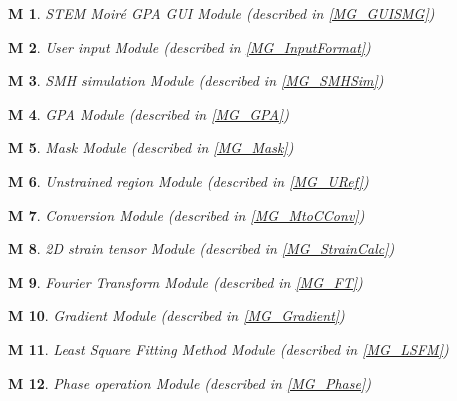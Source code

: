 \documentclass[12pt, titlepage]{article}
\newcommand{\progname}{STEM Moir{\'e} GPA}
\newtheorem{M}{M}
\begin{document}
\begin{M}\normalfont \progname{} GUI Module (described in \cref{MG_GUISMG})
\label{M_GUISMG}
\end{M}

\begin{M}\normalfont User input Module (described in \cref{MG_InputFormat})
\label{M_InputFormat}
\end{M}

\begin{M}\normalfont SMH simulation Module (described in \cref{MG_SMHSim})
\label{M_SMHSim}
\end{M}

\begin{M}\normalfont GPA Module (described in \cref{MG_GPA})
\label{M_GPA}
\end{M}

\begin{M}\normalfont Mask Module (described in \cref{MG_Mask})
\label{M_Mask}
\end{M}

\begin{M}\normalfont Unstrained region Module (described in \cref{MG_URef})
\label{M_URef}
\end{M}

\begin{M}\normalfont Conversion Module (described in \cref{MG_MtoCConv})
\label{M_MtoCConv}
\end{M}

\begin{M}\normalfont 2D strain tensor Module (described in \cref{MG_StrainCalc})
\label{M_StrainCalc}
\end{M}

\begin{M}\normalfont Fourier Transform Module (described in \cref{MG_FT})
\label{M_FT}
\end{M}

\begin{M}\normalfont Gradient Module (described in \cref{MG_Gradient})
\label{M_Gradient}
\end{M}

\begin{M}\normalfont Least Square Fitting Method Module (described in \cref{MG_LSFM})
\label{M_LSFM}
\end{M}

\begin{M}\normalfont Phase operation Module (described in \cref{MG_Phase})
\label{M_Phase}
\end{M}
\end{document}
